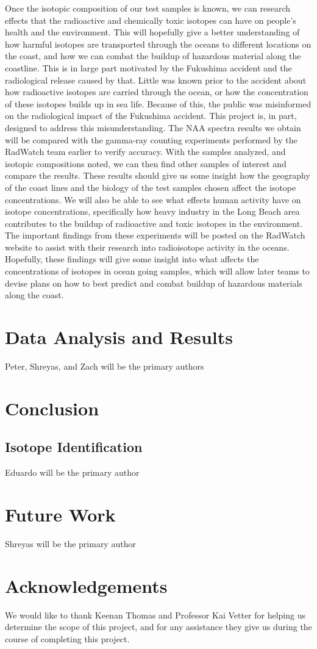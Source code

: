\documentclass[]{article}
\begin{document}
Once the isotopic composition of our test samples is known, we can research effects that the radioactive and chemically toxic isotopes can have on people’s health and the environment. This will hopefully give a better understanding of how harmful isotopes are transported through the oceans to different locations on the coast, and how we can combat the buildup of hazardous material along the coastline. This is in large part motivated by the Fukushima accident and the radiological release caused by that. Little was known prior to the accident about how radioactive isotopes are carried through the ocean, or how the concentration of these isotopes builds up in sea life. Because of this, the public was misinformed on the radiological impact of the Fukushima accident. This project is, in part, designed to address this misunderstanding. The NAA spectra results we obtain will be compared with the gamma-ray counting experiments performed by the RadWatch team earlier to verify accuracy. With the samples analyzed, and isotopic compositions noted, we can then find other samples of interest and compare the results. These results should give us some insight how the geography of the coast lines and the biology of the test samples chosen affect the isotope concentrations. We will also be able to see what effects human activity have on isotope concentrations, specifically how heavy industry in the Long Beach area contributes to the buildup of radioactive and toxic isotopes in the environment. The important findings from these experiments will be posted on the RadWatch website to assist with their research into radioisotope activity in the oceans. Hopefully, these findings will give some insight into what affects the concentrations of isotopes in ocean going samples, which will allow later teams to devise plans on how to best predict and combat buildup of hazardous materials along the coast.  

\section{Data Analysis and Results}
Peter, Shreyas, and Zach will be the primary authors

\section{Conclusion}
\subsection{Isotope Identification}
Eduardo will be the primary author

\section{Future Work}
Shreyas will be the primary author

\section{Acknowledgements}

We would like to thank Keenan Thomas and Professor Kai Vetter for helping us determine the scope of this project, and for any assistance they give us during the course of completing this project.
\end{document}
